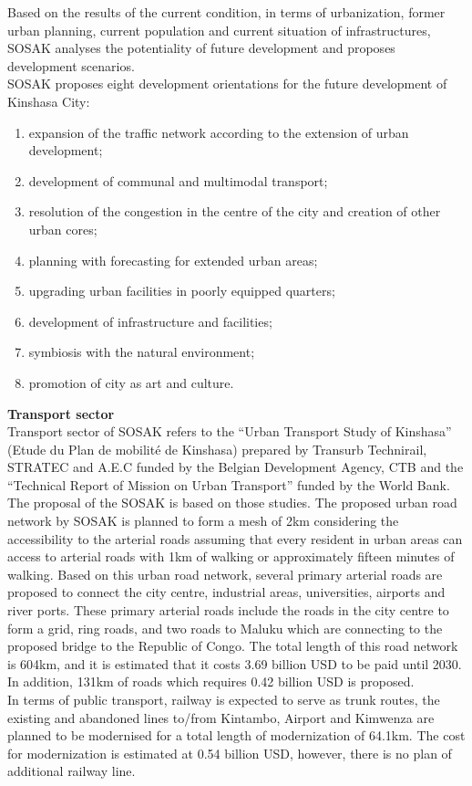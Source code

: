 \documentclass{article}
\begin{document}
Based on the results of the current condition, in terms of urbanization, former urban planning, current population and current situation of infrastructures, SOSAK analyses the potentiality of future development and proposes development scenarios.\\
SOSAK proposes eight development orientations for the future development of Kinshasa City:
\begin{enumerate}
\item expansion of the traffic network according to the extension of urban development;
\item development of communal and multimodal transport;
\item resolution of the congestion in the centre of the city and creation of other urban cores;
\item planning with forecasting for extended urban areas;
\item upgrading urban facilities in poorly equipped quarters;
\item development of infrastructure and facilities;
\item symbiosis with the natural environment;
\item promotion of city as art and culture.
\end{enumerate}
\textbf{Transport sector}\\
Transport sector of SOSAK refers to the “Urban Transport Study of Kinshasa” (Etude du Plan de mobilité de Kinshasa) prepared by Transurb Technirail, STRATEC and A.E.C funded by the Belgian Development Agency, CTB and the “Technical Report of Mission on Urban Transport” funded by the World Bank. The proposal of the SOSAK is based on those studies. 
The proposed urban road network by SOSAK is planned to form a mesh of 2km considering the accessibility to the arterial roads assuming that every resident in urban areas can access to arterial roads with 1km of walking or approximately fifteen minutes of walking. Based on this urban road network, several primary arterial roads are proposed to connect the city centre, industrial areas, universities, airports and river ports. These primary arterial roads include the roads in the city centre to form a grid, ring roads, and two roads to Maluku which are connecting to the proposed bridge to the Republic of Congo. The total length of this road network is 604km, and it is estimated that it costs 3.69 billion USD to be paid until 2030. In addition, 131km of roads which requires 0.42 billion USD is proposed.\\
In terms of public transport, railway is expected to serve as trunk routes, the existing and abandoned lines to/from Kintambo, Airport and Kimwenza are planned to be modernised for a total length of modernization of 64.1km. The cost for modernization is estimated at 0.54 billion USD, however, there is no plan of additional railway line.\\
\end{document}
